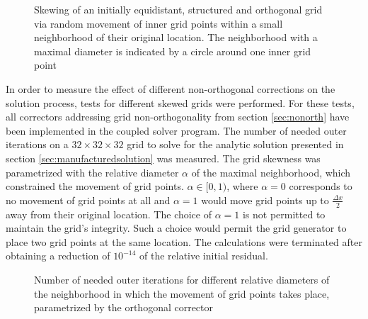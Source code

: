 \begin{figure}[h!]
  \begin{center}
    
    \caption{Skewing of an initially equidistant, structured and orthogonal grid via random movement of inner grid points within a small neighborhood of their original location. The neighborhood with a maximal diameter is indicated by a circle around one inner grid point}
    \label{fig:nonorthgrid}
  \end{center}
\end{figure}

In order to measure the effect of different non-orthogonal corrections on the solution process, tests for different skewed grids were performed. For these tests, all correctors addressing grid non-orthogonality from section \ref{sec:nonorth} have been implemented in the coupled solver program. The number of needed outer iterations on a \(32\times32\times32\) grid to solve for the analytic solution presented in section \ref{sec:manufacturedsolution} was measured. The grid skewness was parametrized with the relative diameter \(\alpha\) of the maximal neighborhood, which constrained the movement of grid points. \(\alpha \in [0,1) \), where \(\alpha = 0\) corresponds to no movement of grid points at all and \(\alpha = 1\) would move grid points up to \(\textstyle \frac{\Delta x}{2} \) away from their original location. The choice of \(\alpha = 1\) is not permitted to maintain the grid's integrity. Such a choice would permit the grid generator to place two grid points at the same location. The calculations were terminated after obtaining a reduction of \(10^{-14}\) of the relative initial residual.

\begin{figure}
  \begin{center}
  \end{center}
\caption{Number of needed outer iterations for different relative diameters of the neighborhood in which the movement of grid points takes place, parametrized by the orthogonal corrector}
\label{fig:nonorth}
\end{figure}

